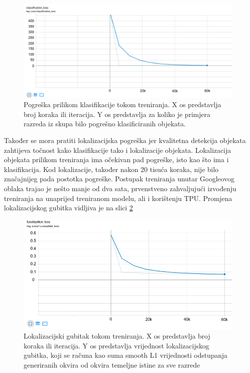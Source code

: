 \begin{figure}[htb]
    \centering
    \includegraphics[width=12cm]{img/class-loss.png}
    \caption{Pogreška prilikom klasifikacije tokom treniranja. X os predstavlja broj koraka ili iteracija. Y os predstavlja 
    za koliko je primjera razreda iz skupa bilo pogrešno klasificiranih objekata.}
    \label{Class-Loss}
\end{figure}


Također se mora pratiti lokalizacijska pogreška jer kvalitetna detekcija objekata zahtijeva točnost kako klasifikacije
tako i lokalizacije objekata.
Lokalizacija objekata prilikom treniranja ima očekivan pad pogreške, isto kao što ima i klasifikacija. Kod lokalizacije, također nakon 20 tisuća koraka, nije bilo značajnijeg pada postotka pogreške. 
Postupak treniranja unutar Googleovog oblaka trajao je nešto manje od dva sata, prvenstveno zahvaljujući izvođenju treniranja na unaprijed treniranom modelu, ali i korištenju TPU. Promjena lokalizacijskog gubitka vidljiva je na slici \ref{Local-Loss} 

\begin{figure}[htb]
    \centering
    \includegraphics[width=12cm]{img/local-loss.png}
    \caption{Lokalizacijski gubitak tokom treniranja. X os predstavlja broj koraka ili iteracija. Y os predstavlja vrijednost lokalizacijskog gubitka, koji 
    se računa kao suma smooth L1 vrijednosti odstupanja generiranih okvira od okvira temeljne istine za sve razrede}
    \label{Local-Loss}
\end{figure}

